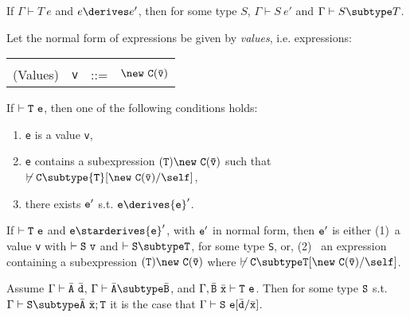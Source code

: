 \begin{theorem} 

If $\Gamma \vdash T\ e$ and $e \derives e'$, then for some type $S$,
$\Gamma \vdash S\ e'$ and $\Gamma \vdash S \subtype T$.

\end{theorem}

Let the normal form of expressions be given by {\em values},
i.e.{} expressions:

\begin{tabular}{rrcl}
&&&\\
(Values) & {\tt v} &{::=}& $\new\ {\tt C(\bar{\tt v})}$
\end{tabular}

\begin{theorem}[Progress] If $\vdash {\tt T\ e}$, then one of the following conditions holds:
\begin{enumerate}
\item {\tt e} is a value {\tt v}, 
\item {\tt e} contains a subexpression ${\tt (T)\new\ C(\bar{\tt
v})}$ such that
$\not\vdash {\tt C} \subtype {\tt T}[{\tt \new\ C(\bar{\tt v})}/\self]$,
\item there exists ${\tt e}'$ s.t. ${\tt e} \derives {\tt e}'$.
\end{enumerate}
\end{theorem}

\begin{theorem} 

If $\vdash {\tt T\ e}$ and ${\tt e} \starderives {\tt e}'$, with ${\tt
e}'$ in normal form, then ${\tt e}'$ is either (1)~a value {\tt v}
with $\vdash {\tt S\ v}$ and $\vdash {\tt S
\subtype T}$, for some type {\tt S}, or, (2)~ an expression containing
a subexpression ${\tt (T)\new\ {\tt C(\bar{\tt v})}}$ where 
$\not\vdash \tt C\subtype T[\new\ C(\bar{\tt v})/\self]$.

\end{theorem}

\begin{lemma}
Assume $\Gamma \vdash \bar{\tt A}\ \bar{\tt d}$, $\Gamma \vdash \bar{\tt A}\subtype \bar{\tt B}$, and $\Gamma, \bar{\tt B}\ \bar{\tt x} \vdash {\tt T}\ {\tt e}$. Then for some type ${\tt S}$ s.t. $\Gamma \vdash {\tt S} \subtype \bar{\tt A}\ \bar{\tt x};{\tt T}$ it is the case that $\Gamma \vdash {\tt S}\ {\tt e}[\bar{\tt d}/\bar{\tt x}]$.
\end{lemma}

